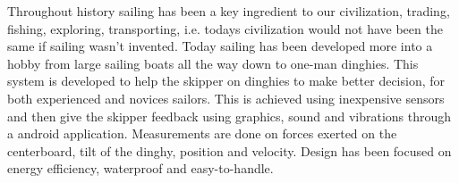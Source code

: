 Throughout history sailing has been a key ingredient to our civilization, trading, fishing, exploring, transporting, i.e. todays civilization would not have been the same if sailing wasn't invented. Today sailing has been developed more into a hobby from large sailing boats all the way down to one-man dinghies. 
This system is developed to help the skipper on dinghies to make better decision, for both experienced and novices sailors. This is achieved using inexpensive sensors and then give the skipper feedback using graphics, sound and vibrations through a android application. Measurements are done on forces exerted on the centerboard, tilt of the dinghy, position and velocity. Design has been focused on energy efficiency, waterproof and easy-to-handle.
